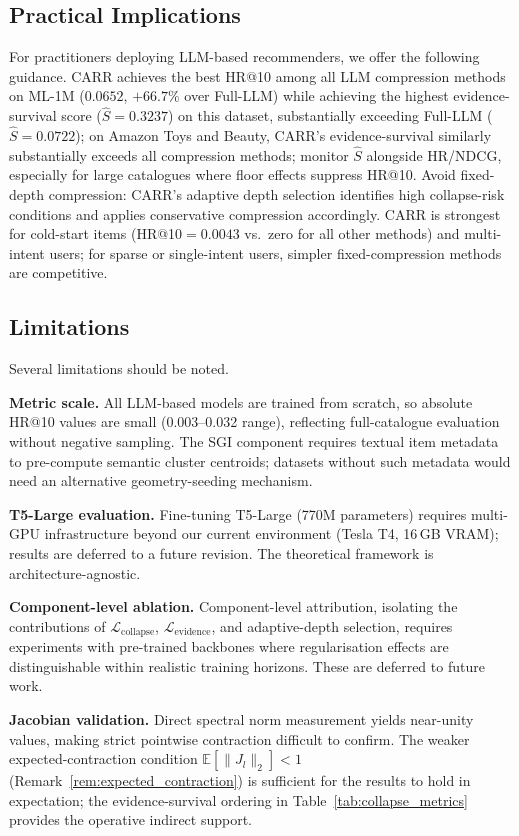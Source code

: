 \documentclass[lettersize,journal]{IEEEtran}
\newcommand{\E}{\mathbb{E}}
\begin{document}
\subsection{Practical Implications}
For practitioners deploying LLM-based recommenders, we offer the following guidance. CARR achieves the best HR@10 among all LLM compression methods on ML-1M ($0.0652$, $+66.7\%$ over Full-LLM) while achieving the highest evidence-survival score ($\widehat{S}=0.3237$) on this dataset, substantially exceeding Full-LLM ($\widehat{S}=0.0722$); on Amazon Toys and Beauty, CARR's evidence-survival similarly substantially exceeds all compression methods; monitor $\widehat{S}$ alongside HR/NDCG, especially for large catalogues where floor effects suppress HR@10. Avoid fixed-depth compression: CARR's adaptive depth selection identifies high collapse-risk conditions and applies conservative compression accordingly. CARR is strongest for cold-start items (HR@10$=0.0043$ vs.\ zero for all other methods) and multi-intent users; for sparse or single-intent users, simpler fixed-compression methods are competitive.

\subsection{Limitations}
Several limitations should be noted.

\textbf{Metric scale.} All LLM-based models are trained from scratch, so absolute HR@10 values are small (0.003--0.032 range), reflecting full-catalogue evaluation without negative sampling. The SGI component requires textual item metadata to pre-compute semantic cluster centroids; datasets without such metadata would need an alternative geometry-seeding mechanism.

\textbf{T5-Large evaluation.} Fine-tuning T5-Large (770M parameters) requires multi-GPU infrastructure beyond our current environment (Tesla T4, 16\,GB VRAM); results are deferred to a future revision. The theoretical framework is architecture-agnostic.

\textbf{Component-level ablation.} Component-level attribution, isolating the contributions of $\mathcal{L}_{\text{collapse}}$, $\mathcal{L}_{\text{evidence}}$, and adaptive-depth selection, requires experiments with pre-trained backbones where regularisation effects are distinguishable within realistic training horizons. These are deferred to future work.

\textbf{Jacobian validation.} Direct spectral norm measurement yields near-unity values, making strict pointwise contraction difficult to confirm. The weaker expected-contraction condition $\E[\|J_l\|_2] < 1$ (Remark~\ref{rem:expected_contraction}) is sufficient for the results to hold in expectation; the evidence-survival ordering in Table~\ref{tab:collapse_metrics} provides the operative indirect support.
\end{document}
